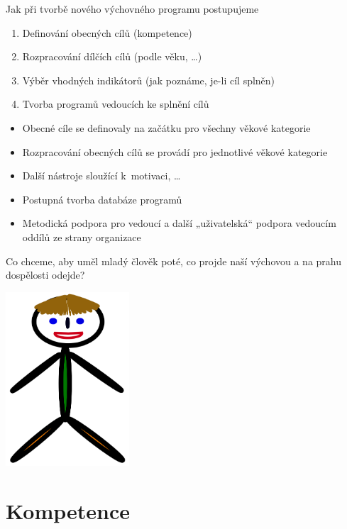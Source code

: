 \documentclass[compress,utf8,xcolor=dvipsnames]{beamer}
\begin{document}
\begin{frame}{Jak při tvorbě nového výchovného programu postupujeme}
\begin{enumerate}
\item Definování obecných cílů (kompetence)
\item Rozpracování dílčích cílů (podle věku, \ldots)
\item Výběr vhodných indikátorů (jak poznáme, je-li cíl splněn)
\item Tvorba programů vedoucích ke splnění cílů
\end{enumerate}
\begin{itemize}
\item Obecné cíle se definovaly na začátku pro všechny věkové kategorie
\item Rozpracování obecných cílů se provádí pro jednotlivé věkové kategorie
\item Další nástroje sloužící k~motivaci, \ldots
\item Postupná tvorba databáze programů
\item Metodická podpora pro vedoucí a další „uživatelská“ podpora vedoucím oddílů ze strany organizace
\end{itemize}
\end{frame}

\begin{frame}{Co chceme, aby uměl mladý člověk poté, co projde naší výchovou a na prahu dospělosti odejde?}
\begin{center}
\includegraphics[height=6.5cm]{pepicek.png}
\end{center}
\end{frame}

\section{Kompetence}
\end{document}
